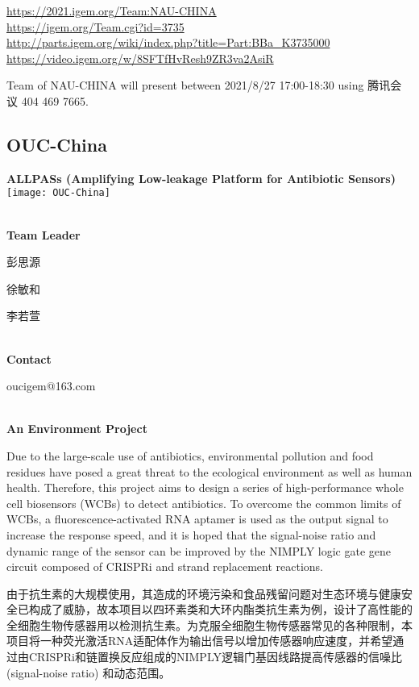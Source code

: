 \url{https://2021.igem.org/Team:NAU-CHINA }\\
\url{https://igem.org/Team.cgi?id=3735 }\\
\url{http://parts.igem.org/wiki/index.php?title=Part:BBa_K3735000 }\\
\url{https://video.igem.org/w/8SFTfHvResh9ZR3va2AsiR }\\

\vfill{}









Team of NAU-CHINA will present between   2021/8/27 17:00-18:30      using 腾讯会议 404 469 7665.
\newpage


\subsection{\textcolor{Blu}{ OUC-China } }
\vspace{5mm}
\begin{center}
\large{
  \textbf{ ALLPASs (Amplifying Low-leakage Platform for Antibiotic Sensors) }\\

  \texttt{[image: OUC-China]}
}
\end{center}
\textbf{\\Team Leader}

  彭思源

  徐敏和

  李若萱


\textbf{\\Contact}

  oucigem@163.com

\textbf{\\An Environment Project\\}\begin{spacing}{1.5}

Due to the large-scale use of antibiotics, environmental pollution and food residues have posed a great threat to the ecological environment as well as human health. Therefore, this project aims to design a series of high-performance whole cell biosensors (WCBs) to detect antibiotics. To overcome the common limits of WCBs, a fluorescence-activated RNA aptamer is used as the output signal to increase the response speed, and it is hoped that the signal-noise ratio and dynamic range of the sensor can be improved by the NIMPLY logic gate gene circuit composed of CRISPRi and strand replacement reactions.

由于抗生素的大规模使用，其造成的环境污染和食品残留问题对生态环境与健康安全已构成了威胁，故本项目以四环素类和大环内酯类抗生素为例，设计了高性能的全细胞生物传感器用以检测抗生素。为克服全细胞生物传感器常见的各种限制，本项目将一种荧光激活RNA适配体作为输出信号以增加传感器响应速度，并希望通过由CRISPRi和链置换反应组成的NIMPLY逻辑门基因线路提高传感器的信噪比 (signal-noise ratio) 和动态范围。\end{spacing}
\\

